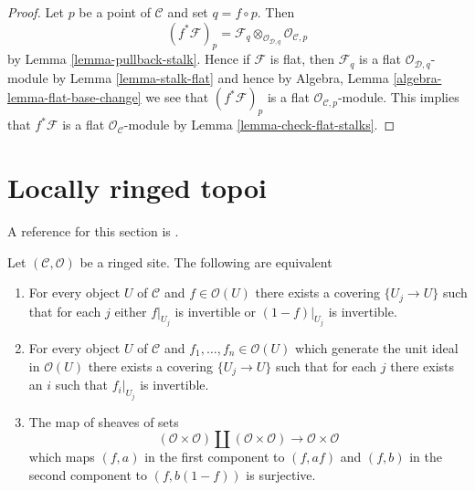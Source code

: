 \begin{proof}
Let $p$ be a point of $\mathcal{C}$ and set $q = f \circ p$. Then
$$
(f^*\mathcal{F})_p =
\mathcal{F}_q \otimes_{\mathcal{O}_{\mathcal{D}, q}}
\mathcal{O}_{\mathcal{C}, p}
$$
by
Lemma \ref{lemma-pullback-stalk}.
Hence if $\mathcal{F}$ is flat, then $\mathcal{F}_q$ is a flat
$\mathcal{O}_{\mathcal{D}, q}$-module by
Lemma \ref{lemma-stalk-flat}
and hence by
Algebra, Lemma \ref{algebra-lemma-flat-base-change}
we see that $(f^*\mathcal{F})_p$ is a flat
$\mathcal{O}_{\mathcal{C}, p}$-module.
This implies that $f^*\mathcal{F}$ is a flat
$\mathcal{O}_\mathcal{C}$-module by
Lemma \ref{lemma-check-flat-stalks}.
\end{proof}






\section{Locally ringed topoi}
\label{section-locally-ringed}


\noindent
A reference for this section is
\cite[Expos\'e IV, Exercice 13.9]{SGA4}.

\begin{lemma}
\label{lemma-locally-ringed}
Let $(\mathcal{C}, \mathcal{O})$ be a ringed site. The following
are equivalent
\begin{enumerate}
\item For every object $U$ of $\mathcal{C}$ and $f \in \mathcal{O}(U)$
there exists a covering $\{U_j \to U\}$ such that for each $j$
either $f|_{U_j}$ is invertible or $(1 - f)|_{U_j}$ is invertible.
\item For every object $U$ of $\mathcal{C}$ and
$f_1, \ldots, f_n \in \mathcal{O}(U)$ which generate the unit ideal
in $\mathcal{O}(U)$  there exists a covering $\{U_j \to U\}$
such that for each $j$ there exists an $i$ such that $f_i|_{U_j}$
is invertible.
\item The map of sheaves of sets
$$
(\mathcal{O} \times \mathcal{O})
\amalg
(\mathcal{O} \times \mathcal{O})
\longrightarrow
\mathcal{O} \times \mathcal{O}
$$
which maps $(f, a)$ in the first component to $(f, af)$ and
$(f, b)$ in the second component to $(f, b(1 - f))$ is surjective.
\end{enumerate}
\end{lemma}

